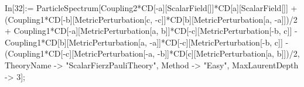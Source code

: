 In[32]:= ParticleSpectrum[Coupling2*CD[-a][ScalarField[]]*CD[a][ScalarField[]] + (Coupling1*CD[-b][MetricPerturbation[c, -c]]*CD[b][MetricPerturbation[a, -a]])/2 + Coupling1*CD[-a][MetricPerturbation[a, b]]*CD[-c][MetricPerturbation[-b, c]] - Coupling1*CD[b][MetricPerturbation[a, -a]]*CD[-c][MetricPerturbation[-b, c]] - (Coupling1*CD[-c][MetricPerturbation[-a, -b]]*CD[c][MetricPerturbation[a, b]])/2, TheoryName -> "ScalarFierzPauliTheory", Method -> "Easy", MaxLaurentDepth -> 3]; 